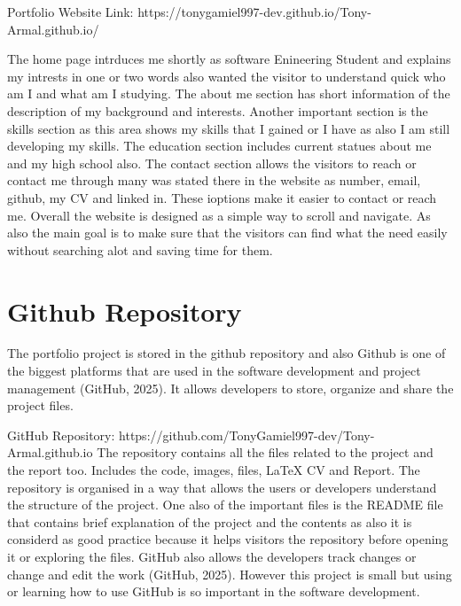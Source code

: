 \documentclass[12pt]{article}
\begin{document}
\vspace{0.4cm}


\newline
Portfolio Website Link: https://tonygamiel997-dev.github.io/Tony-Armal.github.io/
\vspace{0.4cm}

The home page intrduces me shortly as software Enineering Student and explains my intrests in one or two words also wanted the visitor to understand quick who am I and what am I studying. The about me section has short information of the description of my background and interests. Another important section is the skills section as this area shows my skills that I gained or I have as also I am still developing my skills.
The education section includes current statues about me and my high school also. The contact section allows the visitors to reach or contact me through many was stated there in the website as number, email, github, my CV and linked in. These ioptions make it easier to contact or reach me. Overall the website is designed as a simple way to scroll and navigate. As also the main goal is to make sure that the visitors can find what the need easily without searching alot and saving time for them. 


\section*{Github Repository}
The portfolio project is stored in the github repository and also Github is one of the biggest platforms that are used in the software development and project management (GitHub, 2025). It allows developers to store, organize and share the project files.

\vspace{0.4cm}
GitHub Repository: https://github.com/TonyGamiel997-dev/Tony-Armal.github.io
\newline
The repository contains all the files related to the project and the report too. Includes the code, images, files, LaTeX CV and Report. The repository is organised in a way that allows the users or developers understand the structure of the project. One also of the important files is the README file that contains brief explanation of the project and the contents as also it is considerd as good practice because it helps visitors the repository before opening it or exploring the files. GitHub also allows the developers track changes or change and edit the work (GitHub, 2025). However this project is small but using or learning how to use GitHub is so important in the software development.
\end{document}
